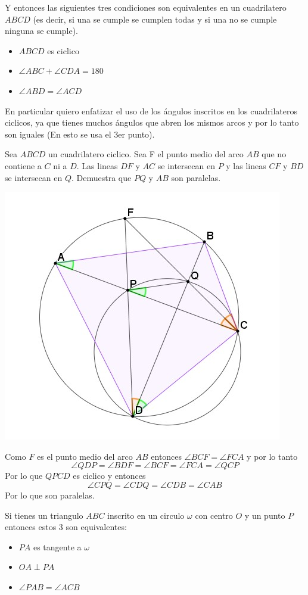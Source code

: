 \documentclass[11pt]{scrartcl}
\begin{document}
Y entonces las siguientes tres condiciones son equivalentes en un cuadrilatero $ABCD$ (es decir, si una se cumple se cumplen todas y si una no se cumple ninguna se cumple). 
\begin{itemize}
    \item $ABCD$ es ciclico
    \item $\angle ABC+\angle CDA=180$
    \item $\angle ABD=\angle ACD$
\end{itemize}
En particular quiero enfatizar el uso de los \'angulos inscritos en los cuadrilateros ciclicos, ya que tienes muchos \'angulos que abren los mismos arcos y por lo tanto son iguales (En esto se usa el 3er punto).
\begin{example}
    Sea $ABCD$ un cuadrilatero ciclico. Sea F el punto medio del arco $AB$ que no contiene a $C$ ni a $D$. Las lineas $DF$ y $AC$ se intersecan en $P$ y las lineas $CF$ y $BD$ se intersecan en $Q$. Demuestra que $PQ$ y $AB$ son paralelas.
\end{example}
\begin{soln}
    \begin{center}
        \includegraphics[scale=0.8]{Img5.jpg}
    \end{center}
    Como $F$ es el punto medio del arco $AB$ entonces $\angle BCF=\angle FCA$ y por lo tanto
    $$\angle QDP=\angle BDF=\angle BCF=\angle FCA=\angle QCP$$
    Por lo que $QPCD$ es ciclico y entonces 
    $$\angle CPQ=\angle CDQ=\angle CDB=\angle CAB$$
    Por lo que son paralelas.
\end{soln}
\begin{theorem}
     Si tienes un triangulo $ABC$ inscrito en un circulo $\omega$ con centro $O$ y un punto $P$ entonces estos 3 son equivalentes:
\begin{itemize}
    \item $PA$ es tangente a $\omega$
    \item $OA \perp PA$
    \item $\angle PAB=\angle ACB$
\end{itemize}
\end{theorem}
\end{document}
